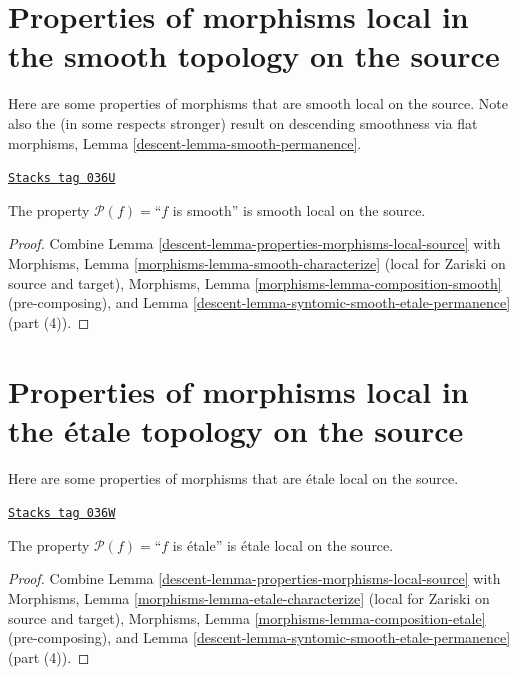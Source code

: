 \section{Properties of morphisms local in the smooth topology on the source}
\label{descent-section-smooth-local-source}
Here are some properties of morphisms that are smooth local on the source.
Note also the (in some respects stronger) result
on descending smoothness via flat morphisms,
Lemma \ref{descent-lemma-smooth-permanence}.

\begin{lemma}
\label{descent-lemma-smooth-smooth-local-source}
\href{https://stacks.math.columbia.edu/tag/036U}{\texttt{Stacks tag 036U}}

The property $\mathcal{P}(f)=$``$f$ is smooth''
is smooth local on the source.
\end{lemma}

\begin{proof}

Combine Lemma \ref{descent-lemma-properties-morphisms-local-source} with
Morphisms, Lemma \ref{morphisms-lemma-smooth-characterize}
(local for Zariski on source and target),
Morphisms, Lemma \ref{morphisms-lemma-composition-smooth} (pre-composing), and
Lemma \ref{descent-lemma-syntomic-smooth-etale-permanence} (part (4)).
\end{proof}

\section{Properties of morphisms local in the \'etale topology on the source}
\label{descent-section-etale-local-source}
Here are some properties of morphisms that are \'etale local on the source.

\begin{lemma}
\label{descent-lemma-etale-etale-local-source}
\href{https://stacks.math.columbia.edu/tag/036W}{\texttt{Stacks tag 036W}}

The property $\mathcal{P}(f)=$``$f$ is \'etale''
is \'etale local on the source.
\end{lemma}

\begin{proof}

Combine Lemma \ref{descent-lemma-properties-morphisms-local-source} with
Morphisms, Lemma \ref{morphisms-lemma-etale-characterize}
(local for Zariski on source and target),
Morphisms, Lemma \ref{morphisms-lemma-composition-etale} (pre-composing), and
Lemma \ref{descent-lemma-syntomic-smooth-etale-permanence} (part (4)).
\end{proof}

